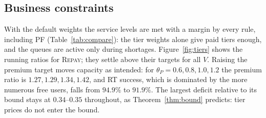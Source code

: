 \documentclass[preprint,11pt]{elsarticle}
\theoremstyle{definition}
\theoremstyle{remark}
\newcommand{\repay}{\textsc{Repay}}
\begin{document}
\begin{table}[t]
\centering
\caption{Additional baselines, trace-driven scenario, site PW0127, load $1$: one elastic device declares video for its whole stay ($120$ devices on six traces).}
\label{tab:baselines-real-dev}
\end{table}

\subsection{Business constraints}\label{sec:exp-tiers}

With the default weights the service levels are met with a margin by every rule, including \textsc{PF} (Table~\ref{tab:compare}): the tier weights alone give paid tiers enough, and the queues are active only during shortages.
Figure~\ref{fig:tiers} shows the running ratios for \repay{}; they settle above their targets for all $V$.
Raising the premium target moves capacity as intended: for $\theta_P=0.6,0.8,1.0,1.2$ the premium ratio is $1.27,1.29,1.34,1.42$, and RT success, which is dominated by the more numerous free users, falls from $94.9\%$ to $91.9\%$.
The largest deficit relative to its bound stays at $0.34$--$0.35$ throughout, as Theorem~\ref{thm:bound} predicts: tier prices do not enter the bound.
\end{document}
